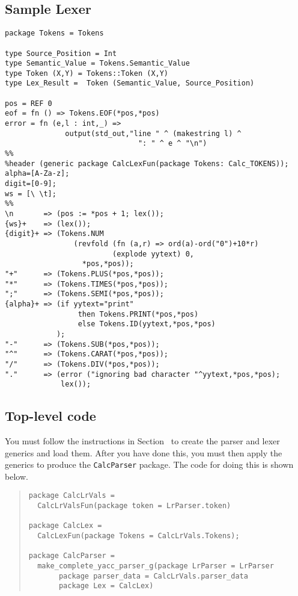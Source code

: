 \subsection{Sample Lexer}
\begin{tt}
\begin{verbatim}
package Tokens = Tokens

type Source_Position = Int
type Semantic_Value = Tokens.Semantic_Value
type Token (X,Y) = Tokens::Token (X,Y)
type Lex_Result =  Token (Semantic_Value, Source_Position)

pos = REF 0
eof = fn () => Tokens.EOF(*pos,*pos)
error = fn (e,l : int,_) =>
              output(std_out,"line " ^ (makestring l) ^
                               ": " ^ e ^ "\n")
%%
%header (generic package CalcLexFun(package Tokens: Calc_TOKENS));
alpha=[A-Za-z];
digit=[0-9];
ws = [\ \t];
%%
\n       => (pos := *pos + 1; lex());
{ws}+    => (lex());
{digit}+ => (Tokens.NUM
                (revfold (fn (a,r) => ord(a)-ord("0")+10*r)
                         (explode yytext) 0,
                  *pos,*pos));
"+"      => (Tokens.PLUS(*pos,*pos));
"*"      => (Tokens.TIMES(*pos,*pos));
";"      => (Tokens.SEMI(*pos,*pos));
{alpha}+ => (if yytext="print"
                 then Tokens.PRINT(*pos,*pos)
                 else Tokens.ID(yytext,*pos,*pos)
            );
"-"      => (Tokens.SUB(*pos,*pos));
"^"      => (Tokens.CARAT(*pos,*pos));
"/"      => (Tokens.DIV(*pos,*pos));
"."      => (error ("ignoring bad character "^yytext,*pos,*pos);
             lex());
\end{verbatim}
\end{tt}
\subsection{Top-level code}

You must follow the instructions in Section~
to create the parser and lexer generics and load them.  After you have
done this, you must then apply the generics to produce the {\tt CalcParser}
package.  The code for doing this is shown below.
\begin{quote}
\begin{verbatim}
package CalcLrVals =
  CalcLrValsFun(package token = LrParser.token)

package CalcLex =
  CalcLexFun(package Tokens = CalcLrVals.Tokens);

package CalcParser =
  make_complete_yacc_parser_g(package LrParser = LrParser
       package parser_data = CalcLrVals.parser_data
       package Lex = CalcLex)
\end{verbatim}
\end{quote}
 
